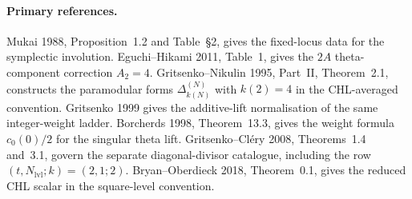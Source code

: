 \paragraph{Primary references.}
Mukai 1988, Proposition~1.2 and Table~\S2, gives the fixed-locus data
for the symplectic involution.  Eguchi--Hikami 2011, Table~1, gives the
$2A$ theta-component correction $A_2=4$.  Gritsenko--Nikulin 1995,
Part~II, Theorem~2.1, constructs the paramodular forms
$\Delta_{k(N)}^{(N)}$ with $k(2)=4$ in the CHL-averaged convention.
Gritsenko 1999 gives the additive-lift normalisation of the same
integer-weight ladder.  Borcherds 1998, Theorem~13.3, gives the weight
formula $c_0(0)/2$ for the singular theta lift.  Gritsenko--Cl\'ery
2008, Theorems~1.4 and~3.1, govern the separate diagonal-divisor
catalogue, including the row $(t,N_{\mathrm{lvl}};k)=(2,1;2)$.
Bryan--Oberdieck 2018, Theorem~0.1, gives the reduced CHL scalar in the
square-level convention.
